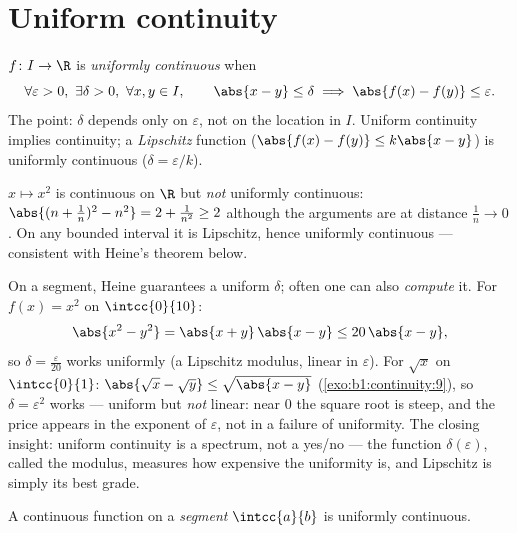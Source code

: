 \section{Uniform continuity}

\begin{definition}\label{def:b1:continuity:uniform}
$f \colon I \to \R$ is \emph{uniformly continuous} when
\[
\forall \varepsilon > 0,\ \exists \delta > 0,\ \forall x, y \in I,
\qquad \abs{x - y} \leq \delta \implies \abs{f(x) - f(y)} \leq
\varepsilon .
\]
The point: $\delta$ depends only on $\varepsilon$, not on the
location in $I$. Uniform continuity implies continuity; a
\emph{Lipschitz} function ($\abs{f(x) - f(y)} \leq k \abs{x - y}$)
is uniformly continuous ($\delta = \varepsilon/k$).
\end{definition}

\begin{example}\label{ex:b1:continuity:notuniform}
$x \mapsto x^2$ is continuous on $\R$ but \emph{not} uniformly
continuous: $\abs{(n + \frac 1n)^2 - n^2} = 2 + \frac{1}{n^2} \geq 2$
although the arguments are at distance $\frac 1n \to 0$. On any
bounded interval it is Lipschitz, hence uniformly continuous ---
consistent with Heine's theorem below.
\end{example}

\begin{example}\label{ex:b1:continuity:moduli}
On a segment, Heine guarantees a uniform $\delta$; often one can
also \emph{compute} it. For $f(x) = x^2$ on $\intcc{0}{10}$:
\[
\abs{x^2 - y^2} = \abs{x + y}\,\abs{x - y} \leq 20\,\abs{x - y},
\]
so $\delta = \frac{\varepsilon}{20}$ works uniformly (a
Lipschitz modulus, linear in $\varepsilon$). For $\sqrt x$ on
$\intcc{0}{1}$: $\abs{\sqrt x - \sqrt y} \leq \sqrt{\abs{x -
y}}$ (\cref{exo:b1:continuity:9}), so $\delta = \varepsilon^2$
works --- uniform but \emph{not} linear: near $0$ the square
root is steep, and the price appears in the exponent of
$\varepsilon$, not in a failure of uniformity. The closing
insight: uniform continuity is a spectrum, not a yes/no ---
the function $\delta(\varepsilon)$, called the modulus, measures
how expensive the uniformity is, and Lipschitz is simply its
best grade.
\end{example}

\begin{theorem}[Heine]\label{thm:b1:continuity:heine}
A continuous function on a \emph{segment} $\intcc{a}{b}$ is uniformly
continuous.
\end{theorem}

